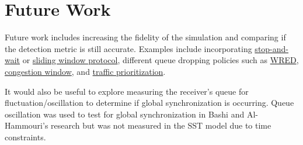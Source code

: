 \documentclass{article}
\begin{document}
\section{Future Work}

Future work includes increasing the fidelity of the simulation and comparing if the detection metric is still accurate. Examples include incorporating  \href{https://www.isi.edu/nsnam/DIRECTED_RESEARCH/DR_HYUNAH/D-Research/stop-n-wait.html}{stop-and-wait} or  \href{https://en.wikipedia.org/wiki/Sliding_window_protocol}{sliding window protocol}, different queue dropping policies such as \href{https://en.wikipedia.org/wiki/Weighted_random_early_detection}{WRED}, \href{https://en.wikipedia.org/wiki/TCP_congestion_control#Congestion_window}{congestion window}, and \href{https://flylib.com/books/en/2.809.1.54/1/}{traffic prioritization}.

It would also be useful to explore measuring the receiver's queue for fluctuation/oscillation to determine if global synchronization is occurring. Queue oscillation was used to test for global synchronization in Bashi and Al-Hammouri's research \cite{Bashi2017} but was not measured in the SST model due to time constraints.





\end{document}
